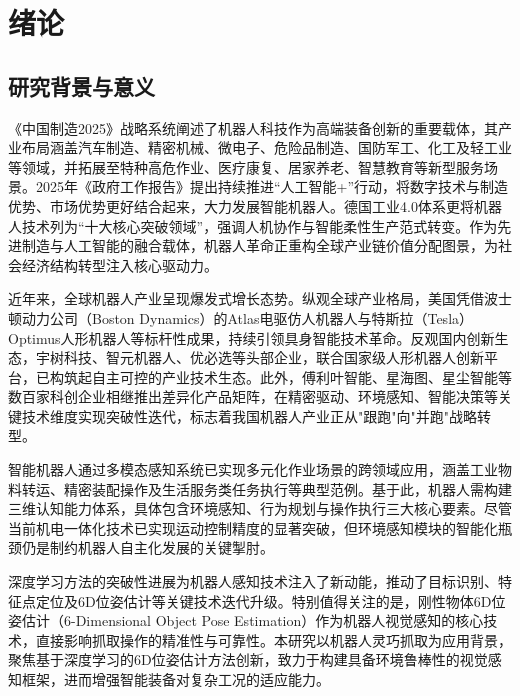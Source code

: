 \chapter{绪论}

\section{研究背景与意义}
《中国制造2025》\cite{中国制造2025}战略系统阐述了机器人科技作为高端装备创新的重要载体，其产业布局涵盖汽车制造、精密机械、微电子、危险品制造、国防军工、化工及轻工业等领域，并拓展至特种高危作业、医疗康复、居家养老、智慧教育等新型服务场景。2025年《政府工作报告》\cite{政府工作报告}提出持续推进“人工智能+”行动，将数字技术与制造优势、市场优势更好结合起来，大力发展智能机器人。德国工业4.0\cite{德国工业4.0}体系更将机器人技术列为“十大核心突破领域”，强调人机协作与智能柔性生产范式转变。作为先进制造与人工智能的融合载体，机器人革命正重构全球产业链价值分配图景，为社会经济结构转型注入核心驱动力。

近年来，全球机器人产业呈现爆发式增长态势\cite{2022中国智能机器人行业研究报告}。纵观全球产业格局，美国凭借波士顿动力公司（Boston Dynamics）的Atlas电驱仿人机器人\cite{bostondynamics}与特斯拉（Tesla）Optimus人形机器人\cite{optimus_wikipedia}等标杆性成果，持续引领具身智能技术革命。反观国内创新生态，宇树科技、智元机器人、优必选等头部企业，联合国家级人形机器人创新平台，已构筑起自主可控的产业技术生态。此外，傅利叶智能、星海图、星尘智能等数百家科创企业相继推出差异化产品矩阵，在精密驱动、环境感知、智能决策等关键技术维度实现突破性迭代，标志着我国机器人产业正从"跟跑"向"并跑"战略转型。

智能机器人通过多模态感知系统已实现多元化作业场景的跨领域应用，涵盖工业物料转运\cite{bostondynamics_box}、精密装配操作\cite{stoegerautomation_spatz}及生活服务类任务执行\cite{xtech_robot}等典型范例。基于此，机器人需构建三维认知能力体系，具体包含环境感知、行为规划与操作执行三大核心要素\cite{蔡自兴2000机器人学}。尽管当前机电一体化技术已实现运动控制精度的显著突破\cite{doi:10.1177/02783649241285161}，但环境感知模块的智能化瓶颈仍是制约机器人自主化发展的关键掣肘\cite{doi:10.1126/scirobotics.adw1608}。

深度学习方法\cite{lecun2015deep}的突破性进展为机器人感知技术注入了新动能，推动了目标识别\cite{objectDetectionSurvey}、特征点定位\cite{keypointSurvey}及6D位姿估计\cite{poseEstimationSurvey}等关键技术迭代升级。特别值得关注的是，刚性物体6D位姿估计（6-Dimensional Object Pose Estimation）作为机器人视觉感知的核心技术，直接影响抓取操作的精准性与可靠性。本研究以机器人灵巧抓取为应用背景，聚焦基于深度学习的6D位姿估计方法创新，致力于构建具备环境鲁棒性的视觉感知框架，进而增强智能装备对复杂工况的适应能力。

